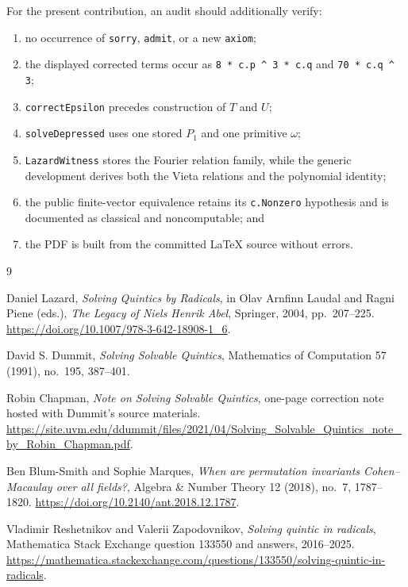\documentclass[11pt,a4paper,oneside]{article}
\newcommand{\lean}[1]{\nolinkurl{#1}}
\begin{document}
For the present contribution, an audit should additionally verify:
\begin{enumerate}
\item no occurrence of \lean{sorry}, \lean{admit}, or a new \lean{axiom};
\item the displayed corrected terms occur as
  \lean{8 * c.p ^ 3 * c.q} and \lean{70 * c.q ^ 3};
\item \lean{correctEpsilon} precedes construction of $T$ and $U$;
\item \lean{solveDepressed} uses one stored $P_1$ and one primitive $\omega$;
\item \lean{LazardWitness} stores the Fourier relation family, while the
  generic development derives both the Vieta relations and the polynomial
  identity;
\item the public finite-vector equivalence retains its \lean{c.Nonzero}
  hypothesis and is documented as classical and noncomputable; and
\item the PDF is built from the committed \LaTeX{} source without errors.
\end{enumerate}

\begin{thebibliography}{9}

Daniel Lazard,
\emph{Solving Quintics by Radicals},
in Olav Arnfinn Laudal and Ragni Piene (eds.),
\emph{The Legacy of Niels Henrik Abel}, Springer, 2004, pp.~207--225.
\url{https://doi.org/10.1007/978-3-642-18908-1_6}.

David S. Dummit,
\emph{Solving Solvable Quintics},
Mathematics of Computation 57 (1991), no.~195, 387--401.

Robin Chapman,
\emph{Note on Solving Solvable Quintics},
one-page correction note hosted with Dummit's source materials.
\url{https://site.uvm.edu/ddummit/files/2021/04/Solving_Solvable_Quintics_note_by_Robin_Chapman.pdf}.

Ben Blum-Smith and Sophie Marques,
\emph{When are permutation invariants Cohen--Macaulay over all fields?},
Algebra \& Number Theory 12 (2018), no.~7, 1787--1820.
\url{https://doi.org/10.2140/ant.2018.12.1787}.

Vladimir Reshetnikov and Valerii Zapodovnikov,
\emph{Solving quintic in radicals},
Mathematica Stack Exchange question 133550 and answers, 2016--2025.
\url{https://mathematica.stackexchange.com/questions/133550/solving-quintic-in-radicals}.

\end{thebibliography}
\end{document}
